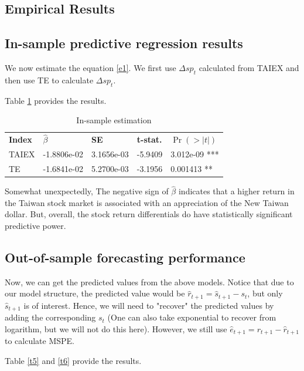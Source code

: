 \documentclass[]{AEA}
\begin{document}
\begin{spacing}{2.0}
\section{Empirical Results}



\subsection{In-sample predictive regression results}

We now estimate the equation \ref{e1}. We first use $\Delta sp_t$ calculated from TAIEX and then use TE to calculate $\Delta sp_t$.

Table \ref{t4} provides the results.


\begin{table}
\caption{In-sample estimation}
\label{t4}
\begin{tabular}{lllll}
\textbf{Index} & \textbf{$\hat \beta$} & \textbf{SE} & \textbf{t-stat.} & \textbf{$\Pr(>|t|)$} \\
TAIEX & -1.8806e-02 & 3.1656e-03 & -5.9409 & 3.012e-09 ***  \\
TE & -1.6841e-02 & 5.2700e-03 & -3.1956 & 0.001413 **  \\
\end{tabular}
\end{table}

Somewhat unexpectedly, The negative sign of $\hat \beta$ indicates that a higher return in the Taiwan stock market is associated with an appreciation of the New Taiwan dollar. But, overall, the stock return differentials do have statistically significant predictive power.



\subsection{Out-of-sample forecasting performance}

Now, we can get the predicted values from the above models. Notice that due to our model structure, the predicted value would be $\hat r_{t+1}=\hat s_{t+1}-s_t$, but only $\hat s_{t+1}$ is of interest. Hence, we will need to "recover" the predicted values by adding the corresponding $s_t$ (One can also take exponential to recover from logarithm, but we will not do this here). However, we still use $\hat e_{t+1}=r_{t+1}-\hat r_{t+1}$ to calculate MSPE.

Table \ref{t5} and \ref{t6} provide the results.


\end{spacing}
\end{document}
